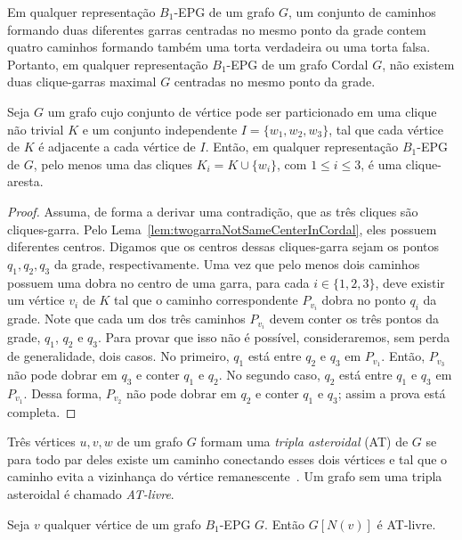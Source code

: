 \begin{lema}\label{lem:twogarraNotSameCenterInCordal}
Em qualquer representação $B_1$-EPG de um grafo $G$, um conjunto de caminhos formando duas diferentes garras centradas no mesmo ponto da grade contem quatro caminhos formando também uma torta verdadeira ou uma torta falsa. Portanto, em qualquer representação $B_1$-EPG de um grafo Cordal $G$, não existem duas  clique-garras maximal  $G$ centradas no mesmo ponto da  grade.
\end{lema}

\begin{lema}\label{lem:3cliquesNotgarra}
Seja $G$ um grafo cujo conjunto de vértice pode ser particionado em uma clique não trivial $K$ e um conjunto independente $I=\{w_1,w_2,w_3\}$, tal que cada vértice de $K$  é adjacente a cada vértice de $I$. Então, em qualquer representação $B_1$-EPG de $G$,  pelo menos uma das cliques  $K_i = K \cup \{w_i\}$, com $1 \leq i \leq 3$,  é uma clique-aresta. 
\end{lema}

\begin{proof}
Assuma, de forma a derivar uma contradição, que as três cliques são cliques-garra. Pelo Lema~\ref{lem:twogarraNotSameCenterInCordal}, eles possuem diferentes centros. Digamos que os centros dessas cliques-garra sejam os pontos $q_1, q_2, q_3$ da grade, respectivamente. Uma vez que pelo menos dois caminhos possuem uma dobra no centro de uma garra, para cada $i\in\{1,2,3\}$,   deve existir um vértice
  $v_i$ de $K$ tal que o caminho correspondente $P_{v_i}$ dobra no ponto $q_i$ da grade.  Note que cada um dos três caminhos $P_{v_i}$ devem conter os três pontos da grade,  $q_1$, $q_2$ e $q_3$. Para provar que isso não é possível, consideraremos, sem perda de generalidade, dois casos.
  No primeiro,  $q_1$ está entre $q_2$ e $q_3$ em $P_{v_1}$. Então, $P_{v_3}$ não pode dobrar em $q_3$ e conter $q_1$ e $q_2$.   No segundo caso,
  $q_2$ está entre $q_1$ e $q_3$ em $P_{v_1}$. Dessa forma, $P_{v_2}$ não pode dobrar em  $q_2$ e conter $q_1$ e $q_3$; assim a prova está completa.
\end{proof}

Três vértices $u, v, w$ de um grafo $G$ formam uma \textit{ tripla asteroidal } (AT) de  $G$ se para todo par deles existe um caminho conectando esses dois  vértices e tal que o caminho evita a vizinhança do vértice remanescente~\cite{Asinowski2009}. Um grafo sem uma tripla asteroidal é chamado \textit{AT-livre}. 

\begin{lema}
 \label{l:AT-livre} Seja $v$ qualquer vértice de um grafo $B_1$-EPG  $G$. Então $G[N(v)]$ é AT-livre.
\end{lema}

